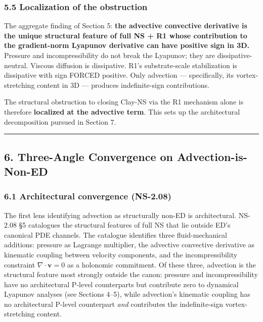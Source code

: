 \documentclass[
]{article}
\begin{document}
\subsubsection{5.5 Localization of the
obstruction}\label{localization-of-the-obstruction}

The aggregate finding of Section 5: \textbf{the advective convective
derivative is the unique structural feature of full NS + R1 whose
contribution to the gradient-norm Lyapunov derivative can have positive
sign in 3D.} Pressure and incompressibility do not break the Lyapunov;
they are dissipative-neutral. Viscous diffusion is dissipative. R1's
substrate-scale stabilization is dissipative with sign FORCED positive.
Only advection --- specifically, its vortex-stretching content in 3D ---
produces indefinite-sign contributions.

The structural obstruction to closing Clay-NS via the R1 mechanism alone
is therefore \textbf{localized at the advective term}. This sets up the
architectural decomposition pursued in Section 7.

\begin{center}\rule{0.5\linewidth}{0.5pt}\end{center}

\subsection{6. Three-Angle Convergence on
Advection-is-Non-ED}\label{three-angle-convergence-on-advection-is-non-ed}

\subsubsection{6.1 Architectural convergence
(NS-2.08)}\label{architectural-convergence-ns-2.08}

The first lens identifying advection as structurally non-ED is
architectural. NS-2.08 §5 catalogues the structural features of full NS
that lie outside ED's canonical PDE channels. The catalogue identifies
three fluid-mechanical additions: pressure as Lagrange multiplier, the
advective convective derivative as kinematic coupling between velocity
components, and the incompressibility constraint
\(\nabla \cdot \mathbf{v} = 0\) as a holonomic commitment. Of these
three, advection is the structural feature most strongly outside the
canon: pressure and incompressibility have no architectural P-level
counterparts but contribute zero to dynamical Lyapunov analyses (see
Sections 4--5), while advection's kinematic coupling has no
architectural P-level counterpart \emph{and} contributes the
indefinite-sign vortex-stretching content.
\end{document}
